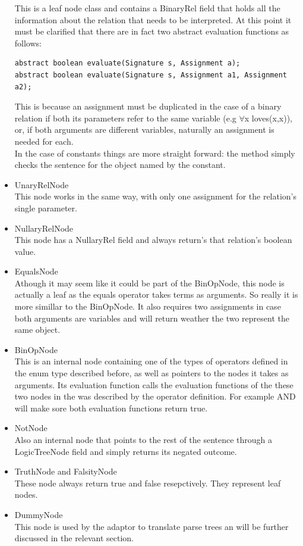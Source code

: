 \documentclass{report}
\begin{document}
\begin{itemize}
This is a leaf node class and contains a BinaryRel field that holds all the information about the relation that needs to be interpreted. At this point it must be clarified that there are in fact two abstract evaluation functions as follows:
\begin{verbatim}
abstract boolean evaluate(Signature s, Assignment a);
abstract boolean evaluate(Signature s, Assignment a1, Assignment a2);
\end{verbatim}
This is because an assignment must be duplicated in the case of a binary relation if both its parameters refer to the same variable (e.g $\forall$x loves(x,x)), or, if both arguments are different variables, naturally an assignment is needed for each. \\
In the case of constants things are more straight forward: the method simply checks the sentence for the object named by the constant.
\item UnaryRelNode \\
This node works in the same way, with only one assignment for the relation's single parameter. 
\item NullaryRelNode \\
This node has a NullaryRel field and always return's that relation's boolean value.
\item EqualsNode \\
Athough it may seem like it could be part of the BinOpNode, this node is actually a leaf as the equals operator takes terms as arguments. So really it is more simillar to the BinOpNode. It also requires two assignments in case both arguments are variables and will return weather the two represent the same object.
\item BinOpNode \\
This is an internal node containing one of the types of operators defined in the enum type described before, as well as pointers to the nodes it takes as arguments. Its evaluation function calls the evaluation functions of the these two nodes in the was described by the operator definition. For example AND will make sore both evaluation functions return true.
\item NotNode \\
Also an internal node that points to the rest of the sentence through a LogicTreeNode field and simply returns its negated outcome.
\item TruthNode and FalsityNode \\
These node always return true and false resepctively. They represent leaf nodes.
\item DummyNode \\
This node is used by the adaptor to translate parse trees an will be further discussed in the relevant section.
\end{itemize}
\end{document}
